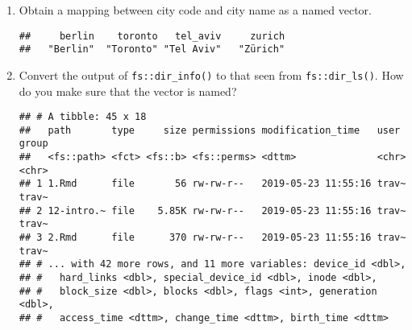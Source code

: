 \documentclass[]{book}
\newenvironment{Shaded}{\begin{snugshade}}{\end{snugshade}}
\newcommand{\CommentTok}[1]{\textcolor[rgb]{0.56,0.35,0.01}{\textit{#1}}}
\newcommand{\KeywordTok}[1]{\textcolor[rgb]{0.13,0.29,0.53}{\textbf{#1}}}
\newcommand{\NormalTok}[1]{#1}
\newcommand{\OperatorTok}[1]{\textcolor[rgb]{0.81,0.36,0.00}{\textbf{#1}}}
\newcommand{\StringTok}[1]{\textcolor[rgb]{0.31,0.60,0.02}{#1}}
\begin{document}
\begin{enumerate}
\def\labelenumi{\arabic{enumi}.}
\item
  Obtain a mapping between city code and city name as a named vector.

\begin{Shaded}
\end{Shaded}

\begin{verbatim}
##     berlin    toronto   tel_aviv     zurich 
##   "Berlin"  "Toronto" "Tel Aviv"   "Zürich"
\end{verbatim}
\item
  Convert the output of \texttt{fs::dir\_info()} to that seen from \texttt{fs::dir\_ls()}. How do you make sure that the vector is named?

\begin{Shaded}
\end{Shaded}

\begin{verbatim}
## # A tibble: 45 x 18
##   path       type     size permissions modification_time   user  group
##   <fs::path> <fct> <fs::b> <fs::perms> <dttm>              <chr> <chr>
## 1 1.Rmd      file       56 rw-rw-r--   2019-05-23 11:55:16 trav~ trav~
## 2 12-intro.~ file    5.85K rw-rw-r--   2019-05-23 11:55:16 trav~ trav~
## 3 2.Rmd      file      370 rw-rw-r--   2019-05-23 11:55:16 trav~ trav~
## # ... with 42 more rows, and 11 more variables: device_id <dbl>,
## #   hard_links <dbl>, special_device_id <dbl>, inode <dbl>,
## #   block_size <dbl>, blocks <dbl>, flags <int>, generation <dbl>,
## #   access_time <dttm>, change_time <dttm>, birth_time <dttm>
\end{verbatim}


\end{enumerate}
\end{document}
